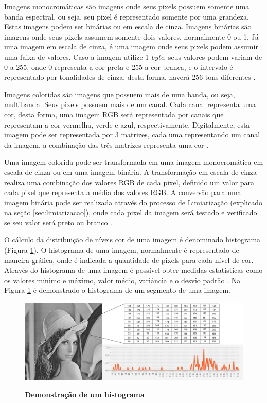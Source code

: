 \documentclass[
	12pt,				%
	oneside,			%
	a4paper,			%
	english,			%
	french,				%
	spanish,			%
	brazil,				%
	]{abntex2}
\begin{document}
Imagens monocromáticas são imagens onde seus pixels possuem somente uma banda espectral, ou seja, seu pixel é representado somente por uma grandeza. Estas imagens podem ser binárias ou em escala de cinza. Imagens binárias são imagens onde seus pixels assumem somente dois valores, normalmente 0 ou 1. Já uma imagem em escala de cinza, é uma imagem onde seus pixels podem assumir uma faixa de valores. Caso a imagem utilize 1 \textit{byte}, seus valores podem variam de 0 a 255, onde 0 representa a cor preta e 255 a cor branca, e o intervalo é representado por tonalidades de cinza, desta forma, haverá 256 tons diferentes \cite{conciAzevedoLeta:2008}.

Imagens coloridas são imagens que possuem mais de uma banda, ou seja, multibanda. Seus pixels possuem mais de um canal. Cada canal representa uma cor, desta forma, uma imagem RGB será representada por canais que representam a cor vermelha, verde e azul, respectivamente. Digitalmente, esta imagem pode ser representada por 3 matrizes, cada uma representando um canal da imagem, a combinação das três matrizes representa uma cor \cite{conciAzevedoLeta:2008}.

Uma imagem colorida pode ser transformada em uma imagem monocromática em escala de cinza ou em uma imagem binária. A transformação em escala de cinza realiza uma combinação dos valores RGB de cada pixel, definido um valor para cada pixel que representa a média dos valores RGB. A conversão para uma imagem binária pode ser realizada através do processo de Limiarização (explicado na seção \ref{sec:limiarizacao}), onde cada pixel da imagem será testado e verificado se seu valor será preto ou branco \cite{mossmann2010extraccao}.

O cálculo da distribuição de níveis cor de uma imagem é denominado histograma (Figura \ref{fig:histograma}). O histograma de uma imagem, normalmente é representado de maneira gráfica, onde é indicada a quantidade de pixels para cada nível de cor. Através do histograma de uma imagem é possível obter medidas estatísticas como os valores mínimo e máximo, valor médio, variância e o desvio padrão \cite{gonzalesWoods:2008}. Na Figura \ref{fig:histograma} é demonstrado o histograma de um segmento de uma imagem. 

\begin{figure}[ht]
\centering
\caption{\textbf{Demonstração de um histograma}}
\includegraphics[width=1\textwidth]{imagens/histograma.png}
\label{fig:histograma}
\sourceAuthor
\end{figure}
\end{document}
